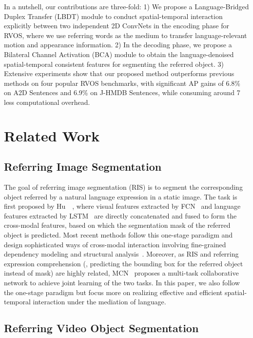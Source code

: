 \documentclass[10pt,twocolumn,letterpaper]{article}
\begin{document}
In a nutshell, our contributions are three-fold:
1) We propose a Language-Bridged Duplex Transfer (LBDT) module to conduct spatial-temporal interaction explicitly between two independent 2D ConvNets in the encoding phase for RVOS, where we use referring words as the medium to transfer language-relevant motion and appearance information.
2) In the decoding phase, we propose a Bilateral Channel Activation (BCA) module to obtain the language-denoised spatial-temporal consistent features for segmenting the referred object.
3) Extensive experiments show that our proposed method outperforms previous methods on four popular RVOS benchmarks, with significant AP gains of 6.8\% on A2D Sentences and 6.9\% on J-HMDB Sentences, while consuming around 7 less computational overhead. 



\section{Related Work}
\label{sec:related}

\subsection{Referring Image Segmentation}
\label{sec:related:ris}

The goal of referring image segmentation (RIS) is to segment the corresponding object referred by a natural language expression in a static image. The task is first proposed by Hu~\etal~\cite{hu2016segmentation}, where visual features extracted by FCN~\cite{long2015fully} and language features extracted by LSTM~\cite{hochreiter1997long} are directly concatenated and fused to form the cross-modal features, based on which the segmentation mask of the referred object is predicted.
Most recent methods follow this one-stage paradigm and design sophisticated ways of cross-modal interaction involving fine-grained dependency modeling and structural analysis~\cite{li2018referring,ye2021referring,jing2021locate,huang2020referring,hui2020linguistic}. Moreover, as RIS and referring expression comprehension (\ie, predicting the bounding box for the referred object instead of mask) are highly related, MCN~\cite{luo2020multi} proposes a multi-task collaborative network to achieve joint learning of the two tasks.
In this paper, we also follow the one-stage paradigm but focus more on realizing effective and efficient spatial-temporal interaction under the mediation of language.

\subsection{Referring Video Object Segmentation}
\label{sec:related:rvos}
\end{document}
